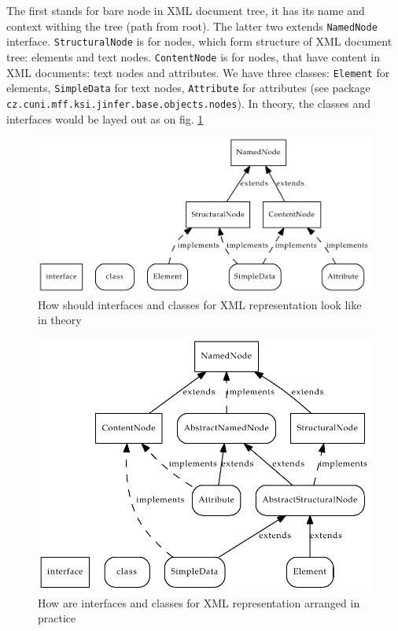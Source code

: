 \documentclass[a4paper,10pt,oneside]{article}
\newcommand{\myscale}{0.74}
\newcommand{\code}[1]{\texttt{#1}}
\begin{document}
The first stands for bare node in XML document tree, it has its name and context withing the tree (path from root).
The latter two extends \code{NamedNode} interface.
\code{StructuralNode} is for nodes, which form structure of XML document tree: elements and text nodes.
\code{ContentNode} is for nodes, that have content in XML documents: text nodes and attributes.
We have three classes: \code{Element} for elements, \code{SimpleData} for text nodes, \code{Attribute} for attributes (see package \code{cz.cuni.mff.ksi.jinfer.base.objects.nodes}).
In theory, the classes and interfaces would be layed out as on fig. \ref{interfaces_nodes}
\begin{figure}
\caption{How should interfaces and classes for XML representation look like in theory} \label{interfaces_nodes}
\centering\includegraphics[scale=\myscale]{interfaces_nodes}
\end{figure}
\begin{figure}
\caption{How are interfaces and classes for XML representation arranged in practice} \label{nodes}
\centering\includegraphics[scale=\myscale]{nodes}
\end{figure}
\end{document}

